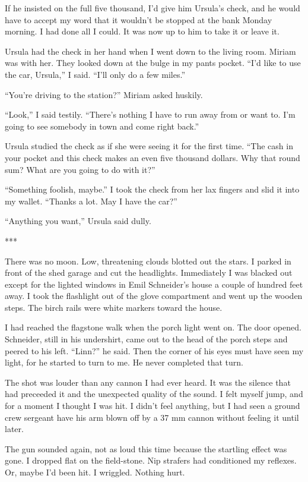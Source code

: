 \documentclass{novel}
\begin{document}
If he insisted on the full five thousand, I’d give him Ursula’s check, and he would have to accept my word that it wouldn’t be stopped at the bank Monday morning. I had done all I could. It was now up to him to take it or leave it.

Ursula had the check in her hand when I went down to the living room. Miriam was with her. They looked down at the bulge in my pants pocket. “I’d like to use the car, Ursula,” I said. “I’ll only do a few miles.”

“You’re driving to the station?” Miriam asked huskily.

“Look,” I said testily. “There’s nothing I have to run away from or want to. I’m going to see somebody in town and come right back.”

Ursula studied the check as if she were seeing it for the first time. “The cash in your pocket and this check makes an even five thousand dollars. Why that round sum? What are you going to do with it?”

“Something foolish, maybe.” I took the check from her lax fingers and slid it into my wallet. “Thanks a lot. May I have the car?”

“Anything you want,” Ursula said dully.

***

There was no moon. Low, threatening clouds blotted out the stars. I parked in front of the shed garage and cut the headlights. Immediately I was blacked out except for the lighted windows in Emil Schneider’s house a couple of hundred feet away. I took the flashlight out of the glove compartment and went up the wooden steps. The birch rails were white markers toward the house.

I had reached the flagstone walk when the porch light went on. The door opened. Schneider, still in his undershirt, came out to the head of the porch steps and peered to his left. “Linn?” he said. Then the corner of his eyes must have seen my light, for he started to turn to me. He never completed that turn.

The shot was louder than any cannon I had ever heard. It was the silence that had preceeded it and the unexpected quality of the sound. I felt myself jump, and for a moment I thought I was hit. I didn’t feel anything, but I had seen a ground crew sergeant have his arm blown off by a 37 mm cannon without feeling it until later.

The gun sounded again, not as loud this time because the startling effect was gone. I dropped flat on the field-stone. Nip strafers had conditioned my reflexes. Or, maybe I’d been hit. I wriggled. Nothing hurt.
\end{document}
